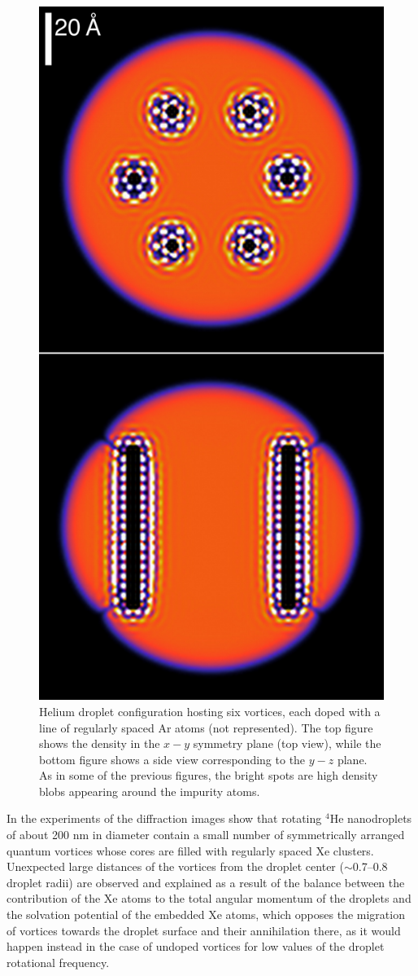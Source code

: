		\begin{figure}[!]
		\centerline{\includegraphics[width=0.6\linewidth,clip]{fig13}}
		\caption{\label{fig13-capture} 
		Helium droplet configuration hosting six vortices, each doped with a line of 
		regularly spaced Ar atoms (not represented). 
		The top figure shows the density in the $x-y$
		symmetry plane (top view), while the bottom figure shows a side view corresponding to the 
		$y-z$ plane. 
		As in some of the previous figures, the bright  spots are high density blobs appearing around the impurity atoms.
		}
		\end{figure}
		
		In the experiments of the diffraction images 
		show that rotating $^4$He nanodroplets of about 200 nm in diameter 
		contain a small number of symmetrically arranged quantum 
		vortices whose cores are filled with regularly spaced 
		Xe clusters. Unexpected large distances 
		of the vortices from the droplet center ($\sim$0.7--0.8 droplet radii) 
		are observed and explained as a result of the balance between 
		the contribution of the Xe atoms to the total angular momentum of the droplets and 
		the solvation potential of the embedded Xe atoms, which opposes the migration of vortices
		towards the droplet surface and their annihilation there, as it would
		happen instead in the case of undoped vortices for low values of the
		droplet rotational frequency.
		
